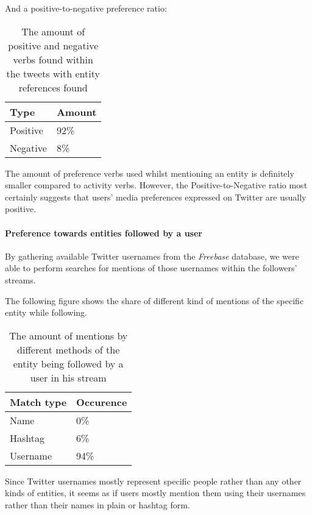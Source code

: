 And a positive-to-negative preference ratio:

\begin{center}
  \begin{table}[h!b!p!]
    \begin{tabular}{ | p{3cm}| p{2cm} | } \hline
      Type & Amount \\ \hline
      Positive & 92\% \\ \hline
      Negative & 8\% \\ \hline
    \end{tabular}
    \caption{The amount of positive and negative verbs found within the tweets with entity references found}
  \end{table}
\end{center}

The amount of preference verbs used whilst mentioning an entity is definitely
smaller compared to activity verbs. However, the Positive-to-Negative ratio most
certainly suggests that users' media preferences expressed on Twitter are
usually positive.

\paragraph{Preference towards entities followed by a user}
By gathering available Twitter usernames from the \textit{Freebase} database,
we were able to perform searches for mentions of those usernames within the followers' streams.

The following figure shows the share of different kind of mentions of the specific entity while following.

\begin{center}
  \begin{table}[h!b!p!]
    \begin{tabular}{ | p{3cm}| p{2cm} | } \hline
      Match type & Occurence \\ \hline
      Name & 0\% \\ \hline
      Hashtag & 6\% \\ \hline
      Username & 94\% \\ \hline
    \end{tabular}
    \caption{The amount of mentions by different methods of the entity being followed by a user in his stream}
  \end{table}
\end{center}

Since Twitter usernames mostly represent specific people rather than any other kinds of entities, it seems as if users mostly
mention them using their usernames rather than their names in plain or hashtag form.

